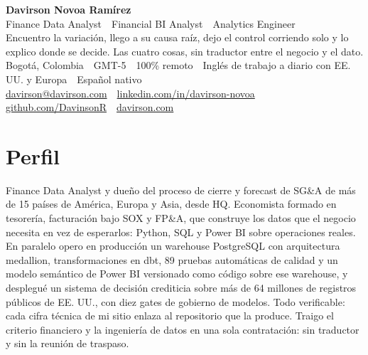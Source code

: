 \documentclass[a4paper,10pt]{article}
\begin{document}
\begin{center}
  {\LARGE\bfseries\color{ink} Davirson Novoa Ramírez}\\[3pt]
  {\large\color{cold} Finance Data Analyst \,\textperiodcentered\, Financial BI Analyst \,\textperiodcentered\, Analytics Engineer}\\[4pt]
  {\small Encuentro la variación, llego a su causa raíz, dejo el control corriendo solo y lo explico donde se decide. Las cuatro cosas, sin traductor entre el negocio y el dato.}\\[3pt]
  {\small Bogotá, Colombia \,\textperiodcentered\, GMT-5 \,\textperiodcentered\, 100\% remoto \,\textperiodcentered\, Inglés de trabajo a diario con EE. UU. y Europa \,\textperiodcentered\, Español nativo}\\[2pt]
  {\small \href{mailto:davirson@davirson.com}{davirson@davirson.com} \,\textperiodcentered\, \href{https://linkedin.com/in/davirson-novoa}{linkedin.com/in/davirson-novoa} \,\textperiodcentered\, \href{https://github.com/DavinsonR}{github.com/DavinsonR} \,\textperiodcentered\, \href{https://davirson.com/es}{davirson.com}}
\end{center}
\vspace{2pt}

\section*{Perfil}
Finance Data Analyst y dueño del proceso de cierre y forecast de SG\&A de más de 15 países de América, Europa y Asia, desde HQ. Economista formado en tesorería, facturación bajo SOX y FP\&A, que construye los datos que el negocio necesita en vez de esperarlos: Python, SQL y Power BI sobre operaciones reales. En paralelo opero en producción un warehouse PostgreSQL con arquitectura medallion, transformaciones en dbt, 89 pruebas automáticas de calidad y un modelo semántico de Power BI versionado como código sobre ese warehouse, y desplegué un sistema de decisión crediticia sobre más de 64 millones de registros públicos de EE. UU., con diez gates de gobierno de modelos. Todo verificable: cada cifra técnica de mi sitio enlaza al repositorio que la produce. Traigo el criterio financiero y la ingeniería de datos en una sola contratación: sin traductor y sin la reunión de traspaso.
\end{document}
